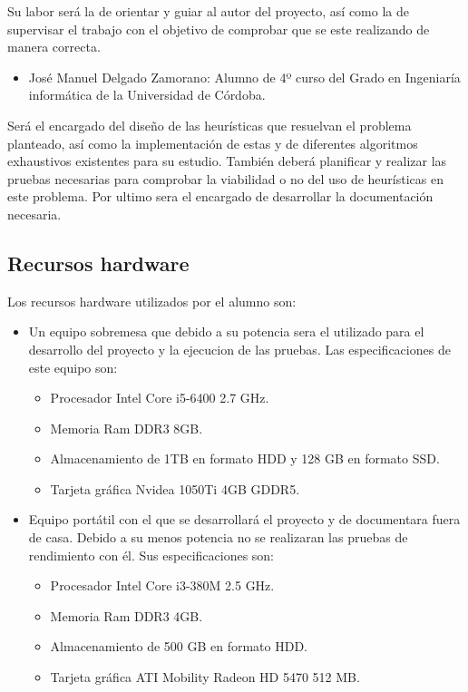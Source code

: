 \documentclass[a4paper,12pt,twoside,final]{book}
\begin{document}
Su labor será la de orientar y guiar al autor del proyecto, así como la de supervisar el trabajo con el objetivo de comprobar que se este realizando de manera correcta.

\begin{itemize}

    \item José Manuel Delgado Zamorano: Alumno de 4º curso del Grado en Ingeniaría informática de la Universidad de Córdoba.
\end{itemize}
Será el encargado del diseño de las heurísticas que resuelvan el problema planteado, así como la implementación de estas y de diferentes algoritmos exhaustivos existentes para su estudio. También deberá planificar y realizar las pruebas necesarias para comprobar la viabilidad o no del uso de heurísticas en este problema. Por ultimo sera el encargado de desarrollar la documentación necesaria. 
    
\subsection{Recursos hardware}
Los recursos hardware utilizados por el alumno son:
\begin{itemize}
    \item Un equipo sobremesa que debido a su potencia sera el utilizado para el desarrollo del proyecto y la ejecucion de las pruebas. Las especificaciones de este equipo son:
        \begin{itemize}
        \item Procesador Intel Core i5-6400 2.7 GHz.
        \item Memoria Ram DDR3 8GB.
        \item Almacenamiento de 1TB en formato HDD y 128 GB en formato SSD.
        \item Tarjeta gráfica Nvidea 1050Ti 4GB GDDR5.
    \end{itemize}
    \newpage
    \item Equipo portátil con el que se desarrollará el proyecto y de documentara fuera de casa. Debido a su menos potencia no se realizaran las pruebas de rendimiento con él. Sus especificaciones son:
        \begin{itemize}
            \item Procesador Intel Core i3-380M 2.5 GHz.
            \item Memoria Ram DDR3 4GB.
            \item Almacenamiento de 500 GB en formato HDD.
            \item Tarjeta gráfica ATI Mobility Radeon HD 5470 512 MB.
    \end{itemize}
\end{itemize}
\end{document}
